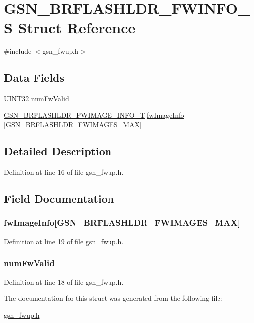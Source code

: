 \hypertarget{a00028}{
\section{GSN\_\-BRFLASHLDR\_\-FWINFO\_\-S Struct Reference}
\label{a00028}
}


{\ttfamily \#include $<$gsn\_\-fwup.h$>$}

\subsection*{Data Fields}
\begin{DoxyCompactItemize}
\item 
\hyperlink{a00660_gae1e6edbbc26d6fbc71a90190d0266018}{UINT32} \hyperlink{a00028_a4e6b3b16bcc01a8e4eb3b3e3d0dea575}{numFwValid}
\item 
\hyperlink{a00027}{GSN\_\-BRFLASHLDR\_\-FWIMAGE\_\-INFO\_\-T} \hyperlink{a00028_aee3da1378cdefc8955d14fd091641a7a}{fwImageInfo} \mbox{[}GSN\_\-BRFLASHLDR\_\-FWIMAGES\_\-MAX\mbox{]}
\end{DoxyCompactItemize}


\subsection{Detailed Description}


Definition at line 16 of file gsn\_\-fwup.h.



\subsection{Field Documentation}
\hypertarget{a00028_aee3da1378cdefc8955d14fd091641a7a}{
\subsubsection[{fwImageInfo}]{ {\bf fwImageInfo}\mbox{[}GSN\_\-BRFLASHLDR\_\-FWIMAGES\_\-MAX\mbox{]}}}
\label{a00028_aee3da1378cdefc8955d14fd091641a7a}


Definition at line 19 of file gsn\_\-fwup.h.

\hypertarget{a00028_a4e6b3b16bcc01a8e4eb3b3e3d0dea575}{
\subsubsection[{numFwValid}]{ {\bf numFwValid}}}
\label{a00028_a4e6b3b16bcc01a8e4eb3b3e3d0dea575}


Definition at line 18 of file gsn\_\-fwup.h.



The documentation for this struct was generated from the following file:\begin{DoxyCompactItemize}
\item 
\hyperlink{a00502}{gsn\_\-fwup.h}\end{DoxyCompactItemize}
